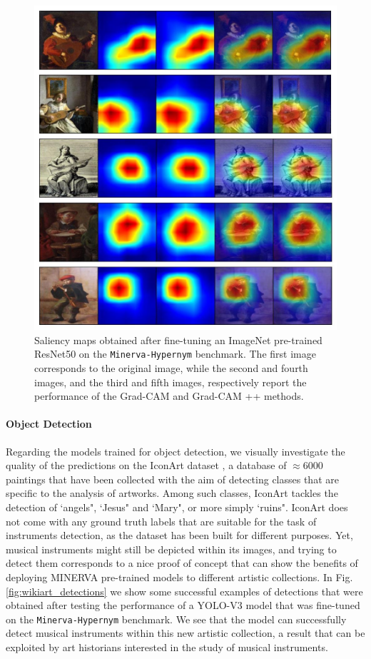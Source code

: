 \begin{figure}[ht!]
\centering
  \includegraphics[width=\linewidth]{./Images/Chapter05/grad_cams}
  \caption{Saliency maps obtained after fine-tuning an ImageNet pre-trained ResNet50 on the \texttt{Minerva-Hypernym} benchmark. The first image corresponds to the original image, while the second and fourth images, and the third and fifth images, respectively report the performance of the Grad-CAM and Grad-CAM ++ methods.}
  \label{fig:grad_cams}
\end{figure}


\paragraph{Object Detection}
Regarding the models trained for object detection, we visually investigate the quality of the predictions on the IconArt dataset \cite{gonthier2018weakly}, a database of $\approx 6000$ paintings that have been collected with the aim of detecting classes that are specific to the analysis of artworks. Among such classes, IconArt tackles the detection of `angels", `Jesus" and `Mary", or more simply `ruins". IconArt does not come with any ground truth labels that are suitable for the task of instruments detection, as the dataset has been built for different purposes. Yet, musical instruments might still be depicted within its images, and trying to detect them corresponds to a nice proof of concept that can show the benefits of deploying MINERVA pre-trained models to different artistic collections. In Fig. \ref{fig:wikiart_detections} we show some successful examples of detections that were obtained after testing the performance of a YOLO-V3 model that was fine-tuned on the \texttt{Minerva-Hypernym} benchmark. We see that the model can successfully detect musical instruments within this new artistic collection, a result that can be exploited by art historians interested in the study of musical instruments.   

